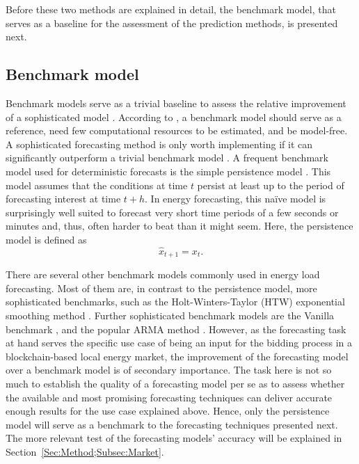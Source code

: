 Before these two methods are explained in detail, the benchmark model, that serves as a baseline for the assessment of the prediction methods, is presented next.



\subsection{Benchmark model} \label{Sec:Method;Subsec:Benchmark}

Benchmark models serve as a trivial baseline to assess the relative improvement of a sophisticated model \citep{Meer:2018}. According to \citet{Pinson:2012}, a benchmark model should serve as a reference, need few computational resources to be estimated, and be model-free. A sophisticated forecasting method is only worth implementing if it can significantly outperform a trivial benchmark model \citep{Diagne:2013}. A frequent benchmark model used for deterministic forecasts is the simple persistence model \citep{Meer:2018}. This model assumes that the conditions at time $t$ persist at least up to the period of forecasting interest at time $t+h$. In energy forecasting, this na\"ive model is surprisingly well suited to forecast very short time periods of a few seconds or minutes \citep{Pinson:2012} and, thus, often harder to beat than it might seem. Here, the persistence model is defined as
%
\begin{equation} \label{Eq:naivepred}
\widehat{x}_{t+1}=x_t.
\end{equation}

There are several other benchmark models commonly used in energy load forecasting. Most of them are, in contrast to the persistence model, more sophisticated benchmarks, such as the Holt-Winters-Taylor (HTW) exponential smoothing method \citep[see, e.g.,][]{Arora:2016}. Further sophisticated benchmark models are the Vanilla benchmark \citep{hong:2010}, and the popular ARMA method \citep{Box:1990}. However, as the forecasting task at hand serves the specific use case of being an input for the bidding process in a blockchain-based local energy market, the improvement of the forecasting model over a benchmark model is of secondary importance. The task here is not so much to establish the quality of a forecasting model per se as to assess whether the available and most promising forecasting techniques can deliver accurate enough results for the use case explained above. Hence, only the persistence model will serve as a benchmark to the forecasting techniques presented next. The more relevant test of the forecasting models' accuracy will be explained in Section~\ref{Sec:Method;Subsec:Market}.



